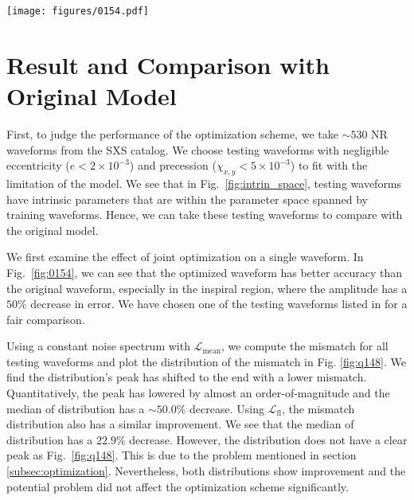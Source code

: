 \documentclass[twocolumn]{aastex631}
\begin{document}
\begin{figure*}[t]
	\centering
	\texttt{[image: figures/0154.pdf]}
	\caption{Comparison between original and optimized IMRPhenomD waveforms.
	Here shows the SXS:BBH:0154 NR waveform, which has mass ratio $q=1$ and
	$\chi_1=\chi_2=-0.8$. The original mismatch is around $2.8\times10^{-4}$ and
	the optimized mismatch is around $5.3\times10^{-5}$. Top: It shows the
	amplitude and phase of NR, original IMRPhenomD and optimized IMRPhenomD
	waveform. Bottom: It shows the relative error of amplitudes between NR and
	IMRPhenomD waveforms, and the absolute error of phases between NR and
	IMRPhenomD waveforms}
	\label{fig:0154}
\end{figure*}

\section{Result and Comparison with Original Model} \label{sec:result}

First, to judge the performance of the optimization scheme, we take $\sim530$ NR
waveforms from the SXS catalog. We choose testing waveforms with negligible
eccentricity (${e<2\times10^{-3}}$) and precession
(${\chi_{x,y}<5\times10^{-3}}$) to fit with the limitation of the model. We see
that in Fig.~\ref{fig:intrin_space}, testing waveforms have intrinsic parameters
that are within the parameter space spanned by training waveforms. Hence, we can
take these testing waveforms to compare with the original model. 

We first examine the effect of joint optimization on a single waveform. In
Fig.~\ref{fig:0154}, we can see that the optimized waveform has better accuracy
than the original waveform, especially in the inspiral region, where the
amplitude has a $50\%$ decrease in error. We have chosen one of the testing
waveforms listed in \citep{khan2016frequency} for a fair comparison. 

Using a constant noise spectrum with $\mathcal{L}_{\mathrm{mean}}$, we compute
the mismatch for all testing waveforms and plot the distribution of the mismatch
in Fig. \ref{fig:q148}. We find the distribution's peak has shifted to the end
with a lower mismatch. Quantitatively, the peak has lowered by almost an
order-of-magnitude and the median of distribution has a $\sim50.0\%$ decrease.
Using $\mathcal{L}_{\mathrm{fl}}$, the mismatch distribution also has a similar
improvement. We see that the median of distribution has a $22.9\%$ decrease.
However, the distribution does not have a clear peak as Fig.~\ref{fig:q148}.
This is due to the problem mentioned in section \ref{subsec:optimization}.
Nevertheless, both distributions show improvement and the potential problem did
not affect the optimization scheme significantly.  
\end{document}
